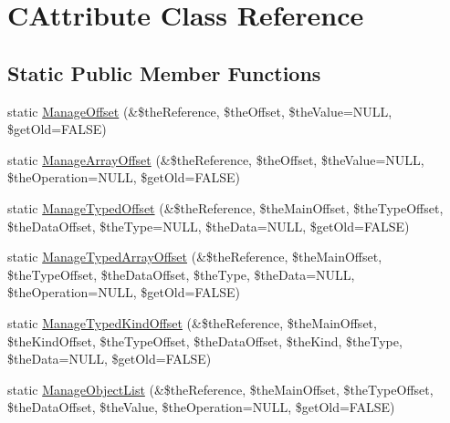 \hypertarget{class_c_attribute}{\section{C\-Attribute Class Reference}
\label{class_c_attribute}
}
\subsection*{Static Public Member Functions}
\begin{DoxyCompactItemize}
\item 
static \hyperlink{class_c_attribute_a9d231a47718719fcd6c33f3d0ac91675}{Manage\-Offset} (\&\$the\-Reference, \$the\-Offset, \$the\-Value=N\-U\-L\-L, \$get\-Old=F\-A\-L\-S\-E)
\item 
static \hyperlink{class_c_attribute_a7d2e35b120eaa55529f78253f77dab48}{Manage\-Array\-Offset} (\&\$the\-Reference, \$the\-Offset, \$the\-Value=N\-U\-L\-L, \$the\-Operation=N\-U\-L\-L, \$get\-Old=F\-A\-L\-S\-E)
\item 
static \hyperlink{class_c_attribute_af163f41d2a8e052c09afe094195ca007}{Manage\-Typed\-Offset} (\&\$the\-Reference, \$the\-Main\-Offset, \$the\-Type\-Offset, \$the\-Data\-Offset, \$the\-Type=N\-U\-L\-L, \$the\-Data=N\-U\-L\-L, \$get\-Old=F\-A\-L\-S\-E)
\item 
static \hyperlink{class_c_attribute_a9841820c02fde7e8f0b9c0a31b8ab1fa}{Manage\-Typed\-Array\-Offset} (\&\$the\-Reference, \$the\-Main\-Offset, \$the\-Type\-Offset, \$the\-Data\-Offset, \$the\-Type, \$the\-Data=N\-U\-L\-L, \$the\-Operation=N\-U\-L\-L, \$get\-Old=F\-A\-L\-S\-E)
\item 
static \hyperlink{class_c_attribute_ab0b7e532b3e0b4dca8fbab9b522e5332}{Manage\-Typed\-Kind\-Offset} (\&\$the\-Reference, \$the\-Main\-Offset, \$the\-Kind\-Offset, \$the\-Type\-Offset, \$the\-Data\-Offset, \$the\-Kind, \$the\-Type, \$the\-Data=N\-U\-L\-L, \$get\-Old=F\-A\-L\-S\-E)
\item 
static \hyperlink{class_c_attribute_a58d5de30d4a6ea29f485a266460a2bdd}{Manage\-Object\-List} (\&\$the\-Reference, \$the\-Main\-Offset, \$the\-Type\-Offset, \$the\-Data\-Offset, \$the\-Value, \$the\-Operation=N\-U\-L\-L, \$get\-Old=F\-A\-L\-S\-E)
\end{DoxyCompactItemize}


